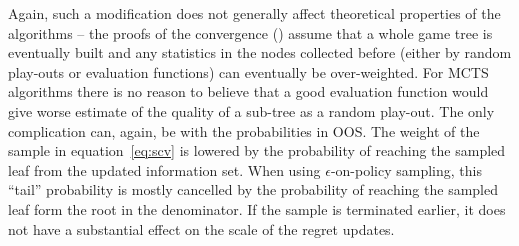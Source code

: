 Again, such a modification does not generally affect theoretical properties of the algorithms -- the proofs of the convergence (\eg \cite{lisy2013-nips}) assume that a whole game tree is eventually built and any statistics in the nodes collected before (either by random play-outs or evaluation functions) can eventually be over-weighted. For MCTS algorithms there is no reason to believe that a good evaluation function would give worse estimate of the quality of a sub-tree as a random play-out. The only complication can, again, be with the probabilities in OOS. The weight of the sample in equation~\ref{eq:scv} is lowered by the probability of reaching the sampled leaf from the updated information set. When using $\epsilon$-on-policy sampling, this ``tail'' probability is mostly cancelled by the probability of reaching the sampled leaf form the root in the denominator. If the sample is terminated earlier, it does not have a substantial effect on the scale of the regret updates.


